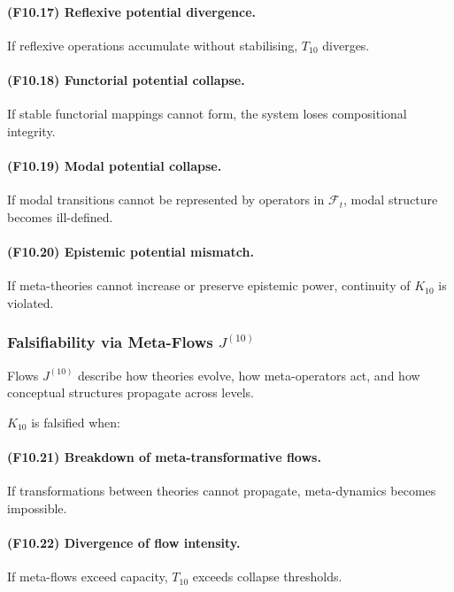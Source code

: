 \paragraph{(F10.17) Reflexive potential divergence.}
If reflexive operations accumulate without stabilising,
$T_{10}$ diverges.

\paragraph{(F10.18) Functorial potential collapse.}
If stable functorial mappings cannot form,
the system loses compositional integrity.

\paragraph{(F10.19) Modal potential collapse.}
If modal transitions cannot be represented by operators in $\mathcal{F}_t$,
modal structure becomes ill-defined.

\paragraph{(F10.20) Epistemic potential mismatch.}
If meta-theories cannot increase or preserve epistemic power,
continuity of $K_{10}$ is violated.



\subsubsection{Falsifiability via Meta-Flows $J^{(10)}$}

Flows $J^{(10)}$ describe how theories evolve, how meta-operators act, 
and how conceptual structures propagate across levels.

$K_{10}$ is falsified when:

\paragraph{(F10.21) Breakdown of meta-transformative flows.}
If transformations between theories cannot propagate,
meta-dynamics becomes impossible.

\paragraph{(F10.22) Divergence of flow intensity.}
If meta-flows exceed capacity, $T_{10}$ exceeds collapse thresholds.

